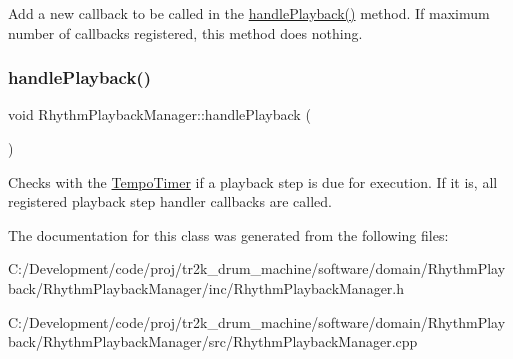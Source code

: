 Add a new callback to be called in the \mbox{\hyperlink{class_rhythm_playback_manager_a281c516f6fea01db436b2ecc90dc9087}{handle\+Playback()}} method. If maximum number of callbacks registered, this method does nothing. \mbox{\label{class_rhythm_playback_manager_a281c516f6fea01db436b2ecc90dc9087}} 
\subsubsection{\texorpdfstring{handlePlayback()}{handlePlayback()}}
{\footnotesize\ttfamily void Rhythm\+Playback\+Manager\+::handle\+Playback (\begin{DoxyParamCaption}{ }\end{DoxyParamCaption})}

Checks with the \mbox{\hyperlink{class_tempo_timer}{Tempo\+Timer}} if a playback step is due for execution. If it is, all registered playback step handler callbacks are called. 

The documentation for this class was generated from the following files\+:\begin{DoxyCompactItemize}
\item 
C\+:/\+Development/code/proj/tr2k\+\_\+drum\+\_\+machine/software/domain/\+Rhythm\+Playback/\+Rhythm\+Playback\+Manager/inc/Rhythm\+Playback\+Manager.\+h\item 
C\+:/\+Development/code/proj/tr2k\+\_\+drum\+\_\+machine/software/domain/\+Rhythm\+Playback/\+Rhythm\+Playback\+Manager/src/Rhythm\+Playback\+Manager.\+cpp\end{DoxyCompactItemize}
